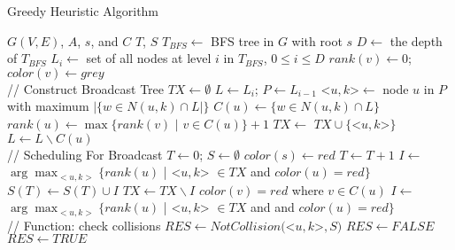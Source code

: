 \documentclass[10pt, conference]{IEEEtran}
\begin{document}
\begin{algorithm}[htb]
\caption{Greedy Heuristic Algorithm}
\label{A1-1}
\begin{algorithmic}[1]
\REQUIRE $G(V, E)$, $A$, $s$, and $C$
\ENSURE $T$, $S$
\STATE $T_{BFS} \leftarrow $ BFS tree in $G$ with root $s$
\STATE $D \leftarrow$ the depth of $T_{BFS}$
\STATE $L_i \leftarrow$ set of all nodes at level $i$ in
$T_{BFS}$, $0 \leq i \leq D$
    \STATE $rank(v) \leftarrow 0$; $color(v) \leftarrow grey$
\ENDFOR\\
// Construct Broadcast Tree
\STATE $TX \leftarrow \emptyset$
    \STATE $L \leftarrow L_{i}$; $P \leftarrow L_{i-1}$
\STATE <$u, k$>$ \leftarrow $ node $u$ in $P$ with maximum $|\{w \in N(u, k) \cap L|\}$
\STATE $C(u) \leftarrow \{w \in N(u, k) \cap L\}$
        \STATE $rank(u) \leftarrow \max\{rank(v)$ $|$ $v \in C(u) \}+1$
\STATE $TX \leftarrow$ $TX \cup \{$<$u, k$>$\}$
        \STATE $L \leftarrow L \backslash C(u)$
    \ENDWHILE
\ENDFOR \\
// Scheduling For Broadcast
\STATE $T \leftarrow 0$; $S \leftarrow \emptyset$
\STATE $color(s) \leftarrow red$
    \STATE $T \leftarrow T + 1$
\STATE  $I \leftarrow $ $\arg \max_{<u,k>} \{rank(u)$ | <$u,k$> $\in TX$ and $color(u) = red \}$
\STATE $S(T) \leftarrow S(T)\cup I$
        \STATE $TX \leftarrow TX \backslash I$
\STATE $color(v) = red$ where $v \in C(u)$
\STATE $I \leftarrow $ $\arg \max_{<u,k>} \{rank(u)$ | <$u,k$> $\in TX$ and  and $color(u) = red \}$
    \ENDWHILE
\ENDWHILE \\
// Function: check collisions
\STATE $RES \leftarrow NotCollision($<$u, k$>$, S)$
        \STATE $RES \leftarrow FALSE$
    \ELSE
        \STATE $RES \leftarrow TRUE$
    \ENDIF
\ENDFOR \\
\end{algorithmic}
\end{algorithm}
\end{document}
